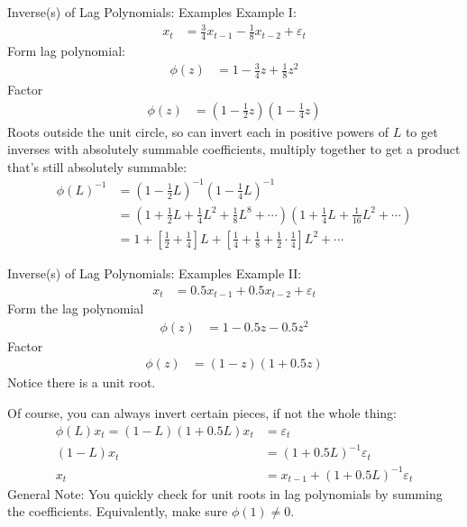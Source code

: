\documentclass[aspectratio=169, handout]{beamer}
\begin{document}
{\scriptsize
\begin{frame}{Inverse(s) of Lag Polynomials: Examples}
Example I:
\begin{align*}
  x_t
  &=
  \frac{3}{4}x_{t-1} - \frac{1}{8}x_{t-2}
  +
  \varepsilon_t
\end{align*}
\pause
Form lag polynomial:
\begin{align*}
  \phi(z)
  &=
  1 - \frac{3}{4}z + \frac{1}{8}z^2
\end{align*}
\pause
Factor
\begin{align*}
  \phi(z)
  &=
  \left(
    1-\frac{1}{2}z
  \right)
  \left(
    1-\frac{1}{4}z
  \right)
\end{align*}
\pause
Roots outside the unit circle, so can invert each in positive powers of
$L$ to get inverses with absolutely summable coefficients, multiply
together to get a product that's still absolutely summable:
\begin{align*}
  \phi(L)^{-1}
  &=
  \left(
    1-\frac{1}{2}L
  \right)^{-1}
  \left(
  1-\frac{1}{4}L
  \right)^{-1}
  \\
  &=
  \left(
    1
    +\frac{1}{2}L
    +\frac{1}{4}L^2
    +\frac{1}{8}L^8
    +\cdots
  \right)
  \left(
    1
    +\frac{1}{4}L
    +\frac{1}{16}L^2
    +\cdots
  \right)
  \\
  &=
  1
  +
  \left[
    \frac{1}{2}
    +
    \frac{1}{4}
  \right]
  L
  +
  \left[
    \frac{1}{4}
    +
    \frac{1}{8}
    +
    \frac{1}{2}
    \cdot
    \frac{1}{4}
  \right]
  L^2
  +
  \cdots
\end{align*}
\end{frame}
}


{\footnotesize
\begin{frame}{Inverse(s) of Lag Polynomials: Examples}
Example II:
\begin{align*}
  x_t
  &= 0.5x_{t-1} + 0.5x_{t-2} + \varepsilon_t
\end{align*}
Form the lag polynomial
\begin{align*}
  \phi(z)
  &= 1 - 0.5z -0.5z^2
\end{align*}
\pause
Factor
\begin{align*}
  \phi(z)
  &= (1-z)(1+0.5z)
\end{align*}
Notice there is a unit root.

\pause
Of course, you can always invert certain pieces, if not the whole thing:
\begin{align*}
  \phi(L)x_t
  =
  (1-L)(1+0.5L)
  x_t
  &=
  \varepsilon_t
  \\
  (1-L)x_t &= (1+0.5L)^{-1}\varepsilon_t
  \\
  x_t &= x_{t-1} + (1+0.5L)^{-1}\varepsilon_t
\end{align*}
\alert{General Note}:
You quickly check for unit roots in lag polynomials by summing the
coefficients. Equivalently, make sure $\phi(1)\neq 0$.
\end{frame}
}
\end{document}
